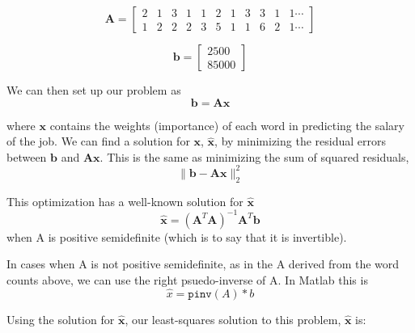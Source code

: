 \documentclass[12pt]{article}
\begin{document}
    \begin{equation*}
        \bm{A} = 
        \begin{bmatrix}
            2 & 1 & 3 & 1 & 1 & 2 & 1 & 3 & 3 & 1 & 1 \cdots \\
            1 & 2 & 2 & 2 & 3 & 5 & 1 & 1 & 6 & 2 & 1 \cdots
        \end{bmatrix}
    \end{equation*}

    \begin{equation*}
        \bm{b} = 
        \begin{bmatrix}
        2500\\
        85000
        \end{bmatrix}
    \end{equation*}

    We can then set up our problem as 
    \begin{equation}\label{eq:linsolve}
        \bm{b} = \bm{Ax}
    \end{equation}

    \noindent where $\bm{x}$ contains the weights (importance) of each word
    in predicting the salary of the job. We can find a solution for
    $\bm{x}$, $\bm{\hat{x}}$, by minimizing the residual errors between $\bm{b}$ and
    $\bm{Ax}$.  This is the same as minimizing the sum of squared residuals,
    \begin{equation}
        \|\bm{b} - \bm{Ax}\|^2_2
    \end{equation}

    \noindent This optimization has a well-known solution for $\bm{\hat{x}}$
    \begin{equation}
        \bm{\hat{x}} = (\bm{A}^{T}\bm{A})^{-1}\bm{A}^T\bm{b}
    \end{equation}
    when A is positive semidefinite (which is to say that it is invertible).
    
    In cases when A is not positive semidefinite, as in the A derived from the 
    word counts above, we can use the right psuedo-inverse of A.  In Matlab this is
    \begin{equation}
    \hat{x} = \texttt{pinv}(A)*b %
    \end{equation}

    Using the solution for $\bm{\hat{x}}$, our least-squares solution to this
    problem, $\bm{\hat{x}}$ is:
\end{document}
